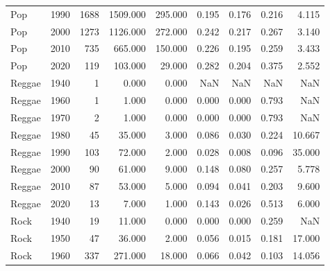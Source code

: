 \begin{table}
{\begin{tabular}{lrrrrrrrr}
                   Pop &           1990 &       1688 & 1509.000 &  295.000 &        0.195 &  0.176 &  0.216 &                  4.115 \\
                   Pop &           2000 &       1273 & 1126.000 &  272.000 &        0.242 &  0.217 &  0.267 &                  3.140 \\
                   Pop &           2010 &        735 &  665.000 &  150.000 &        0.226 &  0.195 &  0.259 &                  3.433 \\
                   Pop &           2020 &        119 &  103.000 &   29.000 &        0.282 &  0.204 &  0.375 &                  2.552 \\
                Reggae &           1940 &          1 &    0.000 &    0.000 &          NaN &    NaN &    NaN &                    NaN \\
                Reggae &           1960 &          1 &    1.000 &    0.000 &        0.000 &  0.000 &  0.793 &                    NaN \\
                Reggae &           1970 &          2 &    1.000 &    0.000 &        0.000 &  0.000 &  0.793 &                    NaN \\
                Reggae &           1980 &         45 &   35.000 &    3.000 &        0.086 &  0.030 &  0.224 &                 10.667 \\
                Reggae &           1990 &        103 &   72.000 &    2.000 &        0.028 &  0.008 &  0.096 &                 35.000 \\
                Reggae &           2000 &         90 &   61.000 &    9.000 &        0.148 &  0.080 &  0.257 &                  5.778 \\
                Reggae &           2010 &         87 &   53.000 &    5.000 &        0.094 &  0.041 &  0.203 &                  9.600 \\
                Reggae &           2020 &         13 &    7.000 &    1.000 &        0.143 &  0.026 &  0.513 &                  6.000 \\
                  Rock &           1940 &         19 &   11.000 &    0.000 &        0.000 &  0.000 &  0.259 &                    NaN \\
                  Rock &           1950 &         47 &   36.000 &    2.000 &        0.056 &  0.015 &  0.181 &                 17.000 \\
                  Rock &           1960 &        337 &  271.000 &   18.000 &        0.066 &  0.042 &  0.103 &                 14.056 \\

\end{tabular}}
\end{table}
